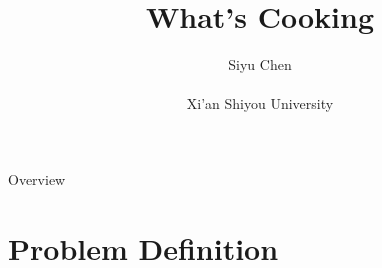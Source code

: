 \documentclass[
 size=14pt,
 paper=smartboard,  %
 mode=present, 		%
 display=slides, 	%
 style=tuliplab,  	%
 pauseslide,
 fleqn,leqno]{powerdot}
\title{What's Cooking}
\author{
Siyu Chen
\\
\\Xi'an Shiyou University

}
\date{\gitCommitterDate}
\begin{document}
\maketitle



\begin{slide}[toc=,bm=]{Overview}
\tableofcontents[content=currentsection,type=1]
\end{slide}


\section{Problem Definition}
\end{document}
